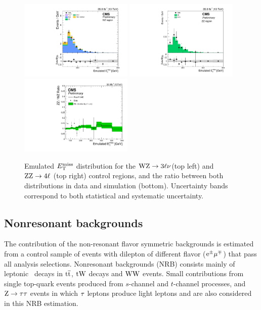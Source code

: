 \begin{figure}[htbp]
\centering
\includegraphics[width=0.48\textwidth]{figures/wz_fakemet_allcuts_postfit.pdf}
\includegraphics[width=0.48\textwidth]{figures/zz_fakemet_allcuts_postfit.pdf}
\includegraphics[width=0.48\textwidth]{figures/ratio_zzvswz.pdf}
\caption{Emulated $E_\mathrm{T}^{\mathrm{miss}}$
distribution for  the $\mathrm{W}\mathrm{Z} \to 3\ell\nu$(top left) and $\mathrm{Z}\mathrm{Z} \to 4\ell$ (top right)
control regions, and the ratio between both distributions in data and simulation (bottom).
 Uncertainty bands correspond to both statistical and systematic uncertainty.}
\label{fig:histo_fakemet}
\end{figure}

\subsection{Nonresonant backgrounds}
\label{ss:dm_nrb}
The contribution of the non-resonant flavor symmetric backgrounds is estimated from a control
sample of events with dilepton of different flavor
($\mathrm{e}^{\pm}\mathrm{\mu}^{\mp}$) that pass all analysis selections.
Nonresonant backgrounds (NRB) consists mainly of leptonic \PW\ decays in
${\mathrm{t}\overline{\mathrm{t}}}$, $\mathrm{t}\mathrm{W}$ decays and 
$\mathrm{W}\mathrm{W}$ events. Small contributions from single top-quark events produced from
$s$-channel and $t$-channel processes, and $\mathrm{Z}\rightarrow \mathrm{\tau}\mathrm{\tau}$
events in which $\mathrm{\tau}$ leptons produce light leptons and \ETm are also
considered in this NRB estimation. 

